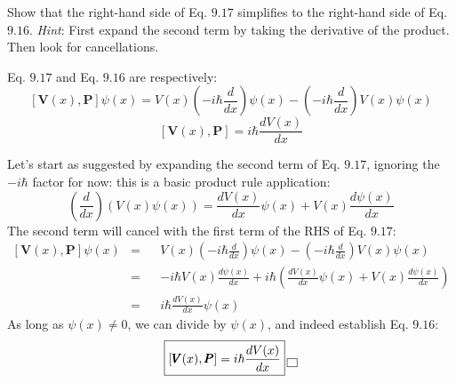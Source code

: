 \documentclass[solutions.tex]{subfiles}
\begin{document}
\maketitle
\begin{exercise} Show that the right-hand side of Eq. $9.17$ simplifies
to the right-hand side of Eq. $9.16$. \textit{Hint}: First expand the
second term by taking the derivative of the product. Then look for
cancellations.
\end{exercise}
Eq. $9.17$ and Eq. $9.16$ are respectively:
\[
	[\bm{V}(x), \bm{P}]\psi(x)
		= V(x)(-i\hbar\frac{d}{dx})\psi(x) - (-i\hbar\frac{d}{dx})V(x)\psi(x)
\]
\[
	[\bm{V}(x), \bm{P}] = i\hbar\frac{dV(x)}{dx}
\]

Let's start as suggested by expanding the second term of Eq. $9.17$,
ignoring the $-i\hbar$ factor for now: this is a basic product
rule application:
\[
	(\frac{d}{dx})(V(x)\psi(x)) =
		\frac{dV(x)}{dx}\psi(x) + V(x)\frac{d\psi(x)}{dx}
\]
The second term will cancel with the first term of the RHS of Eq. $9.17$:
\begin{equation*}\begin{aligned}
	[\bm{V}(x), \bm{P}]\psi(x) &=&&
		V(x)(-i\hbar\frac{d}{dx})\psi(x)
			- (-i\hbar\frac{d}{dx})V(x)\psi(x)	\\
		&=&& -i\hbar V(x)\frac{d\psi(x)}{dx} + i\hbar
			\left(
				\frac{dV(x)}{dx}\psi(x) + V(x)\frac{d\psi(x)}{dx}
			\right) \\
		~ &=&& i\hbar\frac{dV(x)}{dx}\psi(x)
\end{aligned}\end{equation*}
As long as $\psi(x)\neq0$, we can divide by $\psi(x)$, and indeed establish
Eq. $9.16$:
\[
	\boxed{[\pmb{V}(x), \pmb{P}] = i\hbar\frac{dV(x)}{dx}} \,\boxed{\,}
\]
\end{document}
